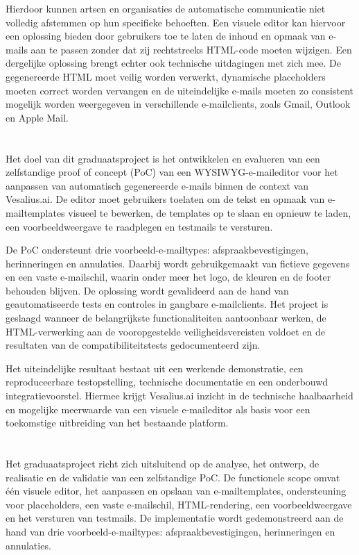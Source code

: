 Hierdoor kunnen artsen en organisaties de automatische communicatie niet
volledig afstemmen op hun specifieke behoeften. Een visuele editor kan hiervoor
een oplossing bieden door gebruikers toe te laten de inhoud en opmaak van
e-mails aan te passen zonder dat zij rechtstreeks HTML-code moeten wijzigen.
Een dergelijke oplossing brengt echter ook technische uitdagingen met zich
mee. De gegenereerde HTML moet veilig worden verwerkt, dynamische placeholders
moeten correct worden vervangen en de uiteindelijke e-mails moeten zo
consistent mogelijk worden weergegeven in verschillende e-mailclients, zoals
Gmail, Outlook en Apple Mail.

\section{}%
\label{sec:doelstelling}
Het doel van dit graduaatsproject is het ontwikkelen en evalueren van een
zelfstandige proof of concept (PoC) van een WYSIWYG-e-maileditor voor het
aanpassen van automatisch gegenereerde e-mails binnen de context van
Vesalius.ai. De editor moet gebruikers toelaten om de tekst en opmaak van
e-mailtemplates visueel te bewerken, de templates op te slaan en opnieuw te
laden, een voorbeeldweergave te raadplegen en testmails te versturen.

De PoC ondersteunt drie voorbeeld-e-mailtypes: afspraakbevestigingen,
herinneringen en annulaties. Daarbij wordt gebruikgemaakt van fictieve
gegevens en een vaste e-mailschil, waarin onder meer het logo, de kleuren en
de footer behouden blijven. De oplossing wordt gevalideerd aan de hand van
geautomatiseerde tests en controles in gangbare e-mailclients. Het project
is geslaagd wanneer de belangrijkste functionaliteiten aantoonbaar werken,
de HTML-verwerking aan de vooropgestelde veiligheidsvereisten voldoet en de
resultaten van de compatibiliteitstests gedocumenteerd zijn.

Het uiteindelijke resultaat bestaat uit een werkende demonstratie, een
reproduceerbare testopstelling, technische documentatie en een onderbouwd
integratievoorstel. Hiermee krijgt Vesalius.ai inzicht in de technische
haalbaarheid en mogelijke meerwaarde van een visuele e-maileditor als basis
voor een toekomstige uitbreiding van het bestaande platform.

\section{}%
\label{sec:afbakening}
Het graduaatsproject richt zich uitsluitend op de analyse, het ontwerp, de
realisatie en de validatie van een zelfstandige PoC. De functionele scope
omvat één visuele editor, het aanpassen en opslaan van e-mailtemplates,
ondersteuning voor placeholders, een vaste e-mailschil, HTML-rendering, een
voorbeeldweergave en het versturen van testmails. De implementatie wordt
gedemonstreerd aan de hand van drie voorbeeld-e-mailtypes:
afspraakbevestigingen, herinneringen en annulaties.

